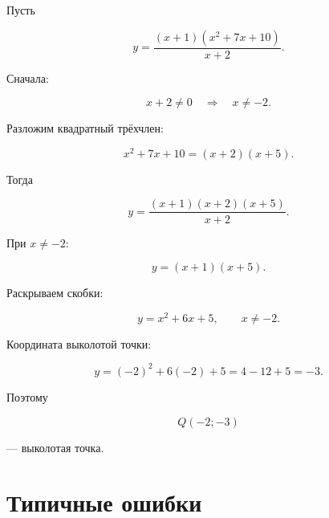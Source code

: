 \documentclass[a4paper,12pt]{article}
\begin{document}
Пусть

\[
y=
\frac{(x+1)(x^2+7x+10)}{x+2}.
\]

Сначала:

\[
x+2\ne0
\quad\Longrightarrow\quad
\boxed{x\ne-2}.
\]

Разложим квадратный трёхчлен:

\[
x^2+7x+10=(x+2)(x+5).
\]

Тогда

\[
y=
\frac{(x+1)(x+2)(x+5)}{x+2}.
\]

При \(x\ne-2\):

\[
y=(x+1)(x+5).
\]

Раскрываем скобки:

\[
\boxed{
y=x^2+6x+5,
\qquad x\ne-2.
}
\]

Координата выколотой точки:

\[
y=(-2)^2+6(-2)+5
=
4-12+5
=
-3.
\]

Поэтому

\[
\boxed{Q(-2;-3)}
\]

--- выколотая точка.



\section{Типичные ошибки}
\end{document}
